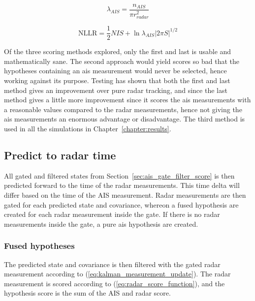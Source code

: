 \begin{equation}\label{eq:ais_clutter_density}
\lambda_{AIS} = \frac{n_{AIS}}{\pi r_{radar}^2}
\end{equation}

\begin{equation}\label{eq:ais_score_function2}
\mathrm{NLLR} = \frac{1}{2} NIS + \ln \lambda_{AIS} |2 \pi S|^{1/2} 
\end{equation}

Of the three scoring methods explored, only the first and last is usable and mathematically sane. The second approach would yield scores so bad that the hypotheses containing an \gls{ais} measurement would never be selected, hence working against its purpose. Testing has shown that both the first and last method gives an improvement over pure radar tracking, and since the last method gives a little more improvement since it scores the \gls{ais} measurements with a reasonable values compared to the radar measurements, hence not giving the \gls{ais} measurements an enormous advantage or disadvantage. The third method is used in all the simulations in Chapter~\ref{chapter:results}.

\subsection{Predict to radar time}
All gated and filtered states from Section~\ref{sec:ais_gate_filter_score} is then predicted forward to the time of the radar measurements. This time delta will differ based on the time of the AIS measurement. Radar measurements are then gated for each predicted state and covariance, whereon a fused hypothesis are created for each radar measurement inside the gate. If there is no radar measurements inside the \gls{gate}, a pure \gls{ais} hypothesis are created. 

\subsubsection{Fused hypotheses}
The predicted state and covariance is then filtered with the gated radar measurement according to (\ref{eq:kalman_measurement_update}). The radar measurement is scored according to (\ref{eq:radar_score_function}), and the hypothesis score is the sum of the AIS and radar score.

